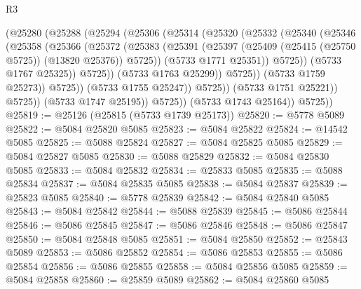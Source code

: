 \begin{lexlean}{R3}
\begin{coremodule}
                          (@25280
                            (@25288
                              (@25294
                                (@25306
                                  (@25314
                                    (@25320
                                      (@25332
                                        (@25340
                                          (@25346
                                            (@25358
                                              (@25366
                                                (@25372
                                                  (@25383
                                                    (@25391
                                                      (@25397
                                                        (@25409
                                                          (@25415 (@25750 @5725))
                                                          (@13820 @25376))
                                                        @5725))
                                                    (@5733 @1771 @25351))
                                                  @5725))
                                              (@5733 @1767 @25325))
                                            @5725))
                                        (@5733 @1763 @25299))
                                      @5725))
                                  (@5733 @1759 @25273))
                                @5725))
                            (@5733 @1755 @25247))
                          @5725))
                      (@5733 @1751 @25221))
                    @5725))
                (@5733 @1747 @25195))
              @5725))
          (@5733 @1743 @25164))
        @5725))
@25819 := @25126 (@25815 (@5733 @1739 @25173))
@25820 := @5778 @5089
@25822 := @5084 @25820 @5085
@25823 := @5084 @25822
@25824 := @14542 @5085
@25825 := @5088 @25824
@25827 := @5084 @25825 @5085
@25829 := @5084 @25827 @5085
@25830 := @5088 @25829
@25832 := @5084 @25830 @5085
@25833 := @5084 @25832
@25834 := @25833 @5085
@25835 := @5088 @25834
@25837 := @5084 @25835 @5085
@25838 := @5084 @25837
@25839 := @25823 @5085
@25840 := @5778 @25839
@25842 := @5084 @25840 @5085
@25843 := @5084 @25842
@25844 := @5088 @25839
@25845 := @5086 @25844
@25846 := @5086 @25845
@25847 := @5086 @25846
@25848 := @5086 @25847
@25850 := @5084 @25848 @5085
@25851 := @5084 @25850
@25852 := @25843 @5089
@25853 := @5086 @25852
@25854 := @5086 @25853
@25855 := @5086 @25854
@25856 := @5086 @25855
@25858 := @5084 @25856 @5085
@25859 := @5084 @25858
@25860 := @25859 @5089
@25862 := @5084 @25860 @5085

\end{coremodule}
\end{lexlean}

